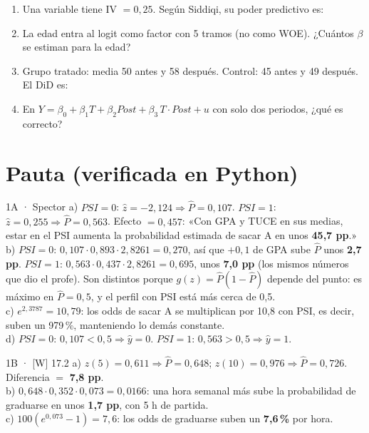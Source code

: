 \documentclass[11pt]{article}
\begin{document}
\begin{enumerate}[label=\textbf{SM\arabic*.},itemsep=4pt,leftmargin=2.8em]
\item Una variable tiene IV $=0{,}25$. Según Siddiqi, su poder predictivo es:
\item La edad entra al logit como factor con 5 tramos (no como WOE). ¿Cuántos $\beta$ se estiman para la edad?
\item Grupo tratado: media 50 antes y 58 después. Control: 45 antes y 49 después. El DiD es:
\item En $Y=\beta_0+\beta_1T+\beta_2Post+\beta_3\,T\cdot Post+u$ con solo dos periodos, ¿qué es correcto?
\end{enumerate}

\newpage
\section*{Pauta (verificada en Python)}

\begin{pauta}{1A · Spector}
a) $PSI=0$: $\hat z=-2{,}124\Rightarrow\hat P=0{,}107$. $PSI=1$: $\hat z=0{,}255\Rightarrow\hat P=0{,}563$. Efecto $=0{,}457$: «Con GPA y TUCE en sus medias, estar en el PSI aumenta la probabilidad estimada de sacar A en unos \textbf{45,7 pp}.»\\
b) $PSI=0$: $0{,}107\cdot0{,}893\cdot2{,}8261=0{,}270$, así que $+0{,}1$ de GPA sube $\hat P$ unos \textbf{2,7 pp}. $PSI=1$: $0{,}563\cdot0{,}437\cdot2{,}8261=0{,}695$, unos \textbf{7,0 pp} (los mismos números que dio el profe). Son distintos porque $g(z)=\hat P(1-\hat P)$ depende del punto: es máximo en $\hat P=0{,}5$, y el perfil con PSI está más cerca de 0,5.\\
c) $e^{2{,}3787}=10{,}79$: los odds de sacar A se multiplican por 10,8 con PSI, es decir, suben un 979\,\%, manteniendo lo demás constante.\\
d) $PSI=0$: $0{,}107<0{,}5\Rightarrow\hat y=0$. $PSI=1$: $0{,}563>0{,}5\Rightarrow\hat y=1$.
\end{pauta}

\begin{pauta}{1B · [W] 17.2}
a) $z(5)=0{,}611\Rightarrow\hat P=0{,}648$; $z(10)=0{,}976\Rightarrow\hat P=0{,}726$. Diferencia $=$ \textbf{7,8 pp}.\\
b) $0{,}648\cdot0{,}352\cdot0{,}073=0{,}0166$: una hora semanal más sube la probabilidad de graduarse en unos \textbf{1,7 pp}, con 5 h de partida.\\
c) $100(e^{0{,}073}-1)=7{,}6$: los odds de graduarse suben un \textbf{7,6\,\%} por hora.
\end{pauta}
\end{document}
